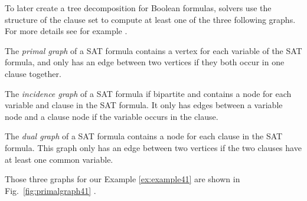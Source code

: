 \documentclass[a4paper, 12pt, bibliography=totoc]{scrartcl}
\begin{document}

To later create a tree decomposition for Boolean formulas, solvers use the structure of the clause set to compute at least one of the three following graphs.
For more details see for example \cite[Chapter~2.1]{DiplomarbeitZisser}.

The \textit{primal graph} of a SAT formula contains a vertex for each variable of the SAT formula, and only has an edge between two vertices if they both occur in one clause together.

The \textit{incidence graph} of a SAT formula if bipartite and contains a node for each variable and clause in the SAT formula. It only has edges between a variable node and a clause node if the variable occurs in the clause.

The \textit{dual graph} of a SAT formula contains a node for each clause in the SAT formula. This graph only has an edge between two vertices if the two clauses have at least one common variable.

Those three graphs for our Example \ref{ex:example41} are shown in Fig.~\ref{fig:primalgraph41} .
\end{document}

